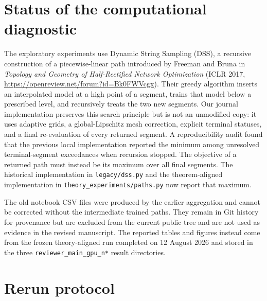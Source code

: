 \documentclass[11pt,a4paper]{article}
\begin{document}
\section*{Status of the computational diagnostic}

The exploratory experiments use Dynamic String Sampling (DSS), a recursive construction of a piecewise-linear path introduced by Freeman and Bruna in \emph{Topology and Geometry of Half-Rectified Network Optimization} (ICLR 2017, \url{https://openreview.net/forum?id=Bk0FWVcgx}). Their greedy algorithm inserts an interpolated model at a high point of a segment, trains that model below a prescribed level, and recursively treats the two new segments. Our journal implementation preserves this search principle but is not an unmodified copy: it uses adaptive grids, a global-Lipschitz mesh correction, explicit terminal statuses, and a final re-evaluation of every returned segment. A reproducibility audit found that the previous local implementation reported the minimum among unresolved terminal-segment exceedances when recursion stopped. The objective of a returned path must instead be its maximum over all final segments. The historical implementation in \texttt{legacy/dss.py} and the theorem-aligned implementation in \texttt{theory\_experiments/paths.py} now report that maximum.

The old notebook CSV files were produced by the earlier aggregation and cannot be corrected without the intermediate trained paths. They remain in Git history for provenance but are excluded from the current public tree and are not used as evidence in the revised manuscript. The reported tables and figures instead come from the frozen theory-aligned run completed on 12 August 2026 and stored in the three \texttt{reviewer\_main\_gpu\_n*} result directories.

\section*{Rerun protocol}
\end{document}
